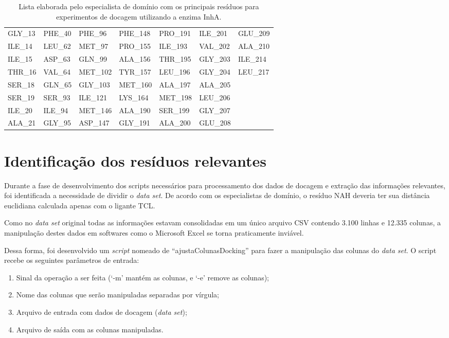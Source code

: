 \begin{table}[h]
\caption{Lista elaborada pelo especialista de domínio com os principais resíduos para experimentos de docagem utilizando a enzima InhA.}
\label{tab:listaOsmar}
\centering
\begin{tabular}{@{}lllllll@{}}
GLY\_13	&	PHE\_40 &	PHE\_96	&	PHE\_148 &	PRO\_191 &	ILE\_201 &	GLU\_209 		\\
ILE\_14	&	LEU\_62 &	MET\_97	&	PRO\_155 &	ILE\_193 &	VAL\_202 &	ALA\_210 		\\
ILE\_15	&	ASP\_63 &	GLN\_99	&	ALA\_156 &	THR\_195 &	GLY\_203 &	ILE\_214 		\\
THR\_16	&	VAL\_64 &	MET\_102 &	TYR\_157 &	LEU\_196 &	GLY\_204 &	LEU\_217 		\\
SER\_18	&	GLN\_65 &	GLY\_103 &	MET\_160 &	ALA\_197 &	ALA\_205 &					\\
SER\_19	&	SER\_93 &	ILE\_121 &	LYS\_164 &	MET\_198 &	LEU\_206 &					\\
ILE\_20	&	ILE\_94	&	MET\_146 &	ALA\_190 &	SER\_199 &	GLY\_207 &					\\
ALA\_21 &	GLY\_95	&	ASP\_147 &	GLY\_191 &	ALA\_200 &	GLU\_208 &					\\ 
\end{tabular}
\end{table}

\section{Identificação dos resíduos relevantes}
\label{sec:IdentificacaoDosResiduosRelevantes}

Durante a fase de desenvolvimento dos scripts necessários para processamento dos dados de docagem e extração das informações relevantes, foi identificada a necessidade de dividir o \emph{data set}. De acordo com os especialistas de domínio, o resíduo NAH deveria ter sua distância euclidiana calculada apenas com o ligante TCL.

Como no \emph{data set} original todas as informações estavam consolidadas em um único arquivo CSV contendo 3.100 linhas e 12.335 colunas, a manipulação destes dados em softwares como o Microsoft Excel se torna praticamente inviável.

Dessa forma, foi desenvolvido um \emph{script} nomeado de ``ajustaColunasDocking'' para fazer a manipulação das colunas do \emph{data set}. O script recebe os seguintes parâmetros de entrada:

\begin{enumerate}
	\item Sinal da operação a ser feita (`-m' mantém as colunas, e `-e' remove as colunas);
	\item Nome das colunas que serão manipuladas separadas por vírgula;
	\item Arquivo de entrada com dados de docagem (\emph{data set});
	\item Arquivo de saída com as colunas manipuladas.
\end{enumerate}

